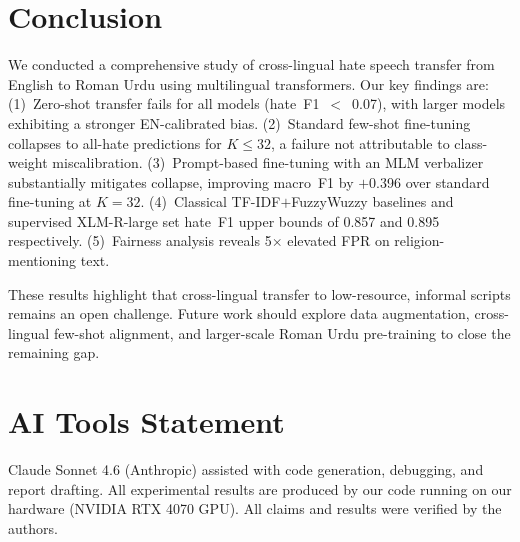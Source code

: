 \documentclass{article}
\begin{document}
\section{Conclusion}
\label{sec:conclusion}

We conducted a comprehensive study of cross-lingual hate speech transfer from
English to Roman Urdu using multilingual transformers.
Our key findings are:
(1)~Zero-shot transfer fails for all models (hate~F1~$<$~0.07), with larger
models exhibiting a stronger EN-calibrated bias.
(2)~Standard few-shot fine-tuning collapses to all-hate predictions for
$K \le 32$, a failure not attributable to class-weight miscalibration.
(3)~Prompt-based fine-tuning with an MLM verbalizer substantially mitigates
collapse, improving macro~F1 by $+$0.396 over standard fine-tuning at $K=32$.
(4)~Classical TF-IDF$+$FuzzyWuzzy baselines and supervised XLM-R-large set
hate~F1 upper bounds of 0.857 and 0.895 respectively.
(5)~Fairness analysis reveals 5$\times$ elevated FPR on religion-mentioning text.

These results highlight that cross-lingual transfer to low-resource, informal
scripts remains an open challenge.
Future work should explore data augmentation, cross-lingual few-shot alignment,
and larger-scale Roman Urdu pre-training to close the remaining gap.

\section*{AI Tools Statement}
Claude Sonnet 4.6 (Anthropic) assisted with code generation, debugging, and
report drafting. All experimental results are produced by our code running on
our hardware (NVIDIA RTX 4070 GPU). All claims and results were verified by the
authors.



\end{document}
